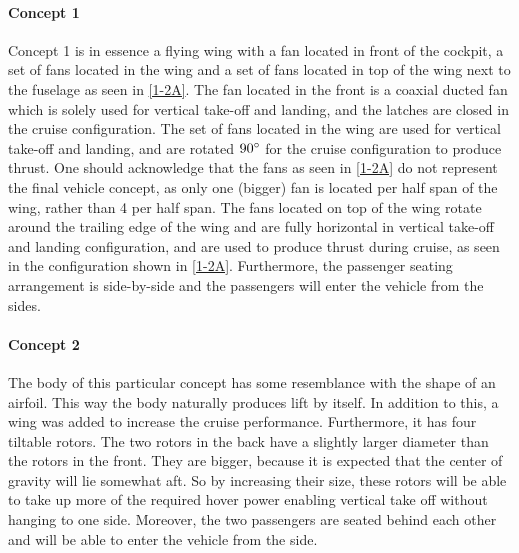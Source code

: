 \paragraph{Concept 1}
Concept 1 is in essence a flying wing with a fan located in front of the cockpit, a set of fans located in the wing and a set of fans located in top of the wing next to the fuselage as seen in \autoref{1-2A}. The fan located in the front is a coaxial ducted fan which is solely used for vertical take-off and landing, and the latches are closed in the cruise configuration. The set of fans located in the wing are used for vertical take-off and landing, and are rotated $90\degree$ for the cruise configuration to produce thrust. One should acknowledge that the fans as seen in \autoref{1-2A} do not represent the final vehicle concept, as only one (bigger) fan is located per half span of the wing, rather than 4 per half span. The fans located on top of the wing rotate around the trailing edge of the wing and are fully horizontal in vertical take-off and landing configuration, and are used to produce thrust during cruise, as seen in the configuration shown in \autoref{1-2A}. Furthermore, the passenger seating arrangement is side-by-side and the passengers will enter the vehicle from the sides.

\paragraph{Concept 2}
The body of this particular concept has some resemblance with the shape of an airfoil. This way the body naturally produces lift by itself. In addition to this, a wing was added to increase the cruise performance. Furthermore, it has four tiltable rotors. The two rotors in the back have a slightly larger diameter than the rotors in the front. They are bigger, because it is expected that the center of gravity will lie somewhat aft. So by increasing their size, these rotors will be able to take up more of the required hover power enabling vertical take off without hanging to one side. Moreover, the two passengers are seated behind each other and will be able to enter the vehicle from the side. 

